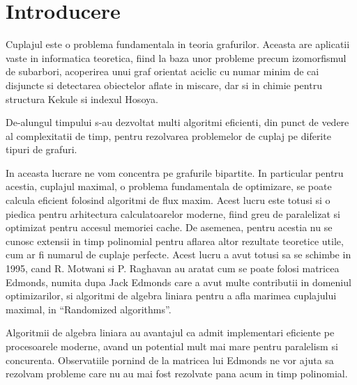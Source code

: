 \chapter{Introducere}

Cuplajul este o problema fundamentala in teoria grafurilor. Aceasta are
aplicatii vaste in informatica teoretica, fiind la baza unor probleme precum
izomorfismul de subarbori, acoperirea unui graf orientat aciclic cu numar minim
de cai disjuncte si detectarea obiectelor aflate in miscare, dar si in chimie
pentru structura Kekule si indexul Hosoya. \par %

De-alungul timpului s-au dezvoltat multi algoritmi eficienti, din punct de
vedere al complexitatii de timp, pentru rezolvarea problemelor de cuplaj pe
diferite tipuri de grafuri. \par

In aceasta lucrare ne vom concentra pe grafurile bipartite. In particular pentru
acestia, cuplajul maximal, o problema fundamentala de optimizare, se poate
calcula eficient folosind algoritmi de flux maxim. Acest lucru este totusi si o
piedica pentru arhitectura calculatoarelor moderne, fiind greu de paralelizat si
optimizat pentru accesul memoriei cache. De asemenea, pentru acestia nu se
cunosc extensii in timp polinomial pentru aflarea altor rezultate teoretice
utile, cum ar fi numarul de cuplaje perfecte. Acest lucru a avut totusi sa se
schimbe in 1995, cand R. Motwani si P. Raghavan au aratat cum se poate folosi
matricea Edmonds, numita dupa Jack Edmonds care a avut multe contributii in
domeniul optimizarilor, si algoritmi de algebra liniara pentru a afla marimea
cuplajului maximal, in ``Randomized algorithms''\cite{randomizedalgorithms}. \par

Algoritmii de algebra liniara au avantajul ca admit implementari eficiente pe
procesoarele moderne, avand un potential mult mai mare pentru paralelism si
concurenta. Observatiile pornind de la matricea lui Edmonds ne vor ajuta sa rezolvam
probleme care nu au mai fost rezolvate pana acum in timp polinomial. \par
